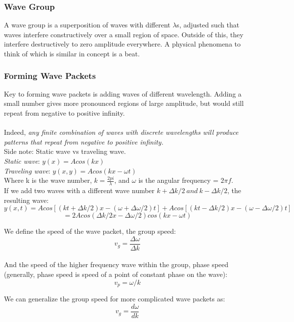\documentclass[class=article,crop=false]{standalone}
\begin{document}
\subsubsection{Wave Group}
A wave group is a superposition of waves with different $\lambda$s, adjusted such that waves interfere constructively over a small region of space. Outside of this, they interfere destructively to zero amplitude everywhere. A physical phenomena to think of which is similar in concept is a beat. 

\subsubsection{Forming Wave Packets}
Key to forming wave packets is adding waves of different wavelength. Adding a small number gives more pronounced regions of large amplitude, but would still repeat from negative to positive infinity.\\ \\

Indeed, \emph{any finite combination of waves with discrete wavelengths will produce patterns that repeat from negative to positive infinity.}\\

Side note: Static wave vs traveling wave.\\
\emph{Static wave}: $y(x) = A cos(kx)$\\
\emph{Traveling wave}: $y(x, y) = A cos(kx - \omega t)$ \\
Where k is the wave number, $k = \frac{2pi}{\lambda}$, and $\omega$ is the angular frequency = $2\pi f$. \\

If we add two waves with a different wave number $k + \Delta k/2\ and\ k-\Delta k/2$, the resulting wave:
$$y(x, t) = A cos \left[(kt + \Delta k/2) x - (\omega + \Delta \omega/2)t \right] + A cos \left[ (kt - \Delta k/2) x - (\omega - \Delta \omega/2)t \right] $$
$$ = 2A cos \left( \Delta k/2 x - \Delta \omega / 2 \right) cos(kx - \omega t) $$

We define the speed of the wave packet, the group speed:
$$ v_g = \frac{\Delta \omega}{\Delta k} $$
\\

And the speed of the higher frequency wave within the group, phase speed (generally, phase speed is speed of a point of constant phase on the wave):
$$ v_p = \omega/k $$

We can generalize the group speed for more complicated wave packets as:
$$ v_g = \frac{d\omega}{dk} $$
\end{document}
